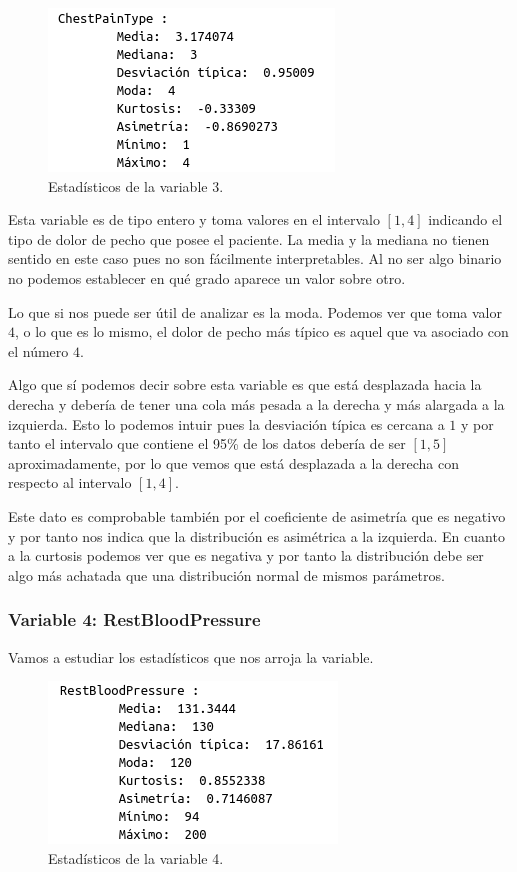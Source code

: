 \documentclass[12pt,a4paper]{article}
\begin{document}
\begin{figure}[H]
	\centering
	\includegraphics[scale=0.7]{./Imagenes/EDA/Clasificacion/estadisticos_variable3.png}
	\caption{Estadísticos de la variable 3.}
\end{figure}

Esta variable es de tipo entero y toma valores en el intervalo $[1,4]$ indicando el tipo de dolor de pecho que posee el paciente. La media y la mediana no tienen sentido en este caso pues no son fácilmente interpretables. Al no ser algo binario no podemos establecer en qué grado aparece un valor sobre otro.

Lo que si nos puede ser útil de analizar es la moda. Podemos ver que toma valor $4$, o lo que es lo mismo, el dolor de pecho más típico es aquel que va asociado con el número $4$.

Algo que sí podemos decir sobre esta variable es que está desplazada hacia la derecha y debería de tener una cola más pesada a la derecha y más alargada a la izquierda. Esto lo podemos intuir pues la desviación típica es cercana a $1$ y por tanto el intervalo que contiene el 95\% de los datos debería de ser $[1,5]$ aproximadamente, por lo que vemos que está desplazada a la derecha con respecto al intervalo $[1,4]$.

Este dato es comprobable también por el coeficiente de asimetría que es negativo y por tanto nos indica que la distribución es asimétrica a la izquierda. En cuanto a la curtosis podemos ver que es negativa y por tanto la distribución debe ser algo más achatada que una distribución normal de mismos parámetros.

\subsubsection*{Variable 4: RestBloodPressure}

Vamos a estudiar los estadísticos que nos arroja la variable.

\begin{figure}[H]
	\centering
	\includegraphics[scale=0.7]{./Imagenes/EDA/Clasificacion/estadisticos_variable4.png}
	\caption{Estadísticos de la variable 4.}
\end{figure}
\end{document}
